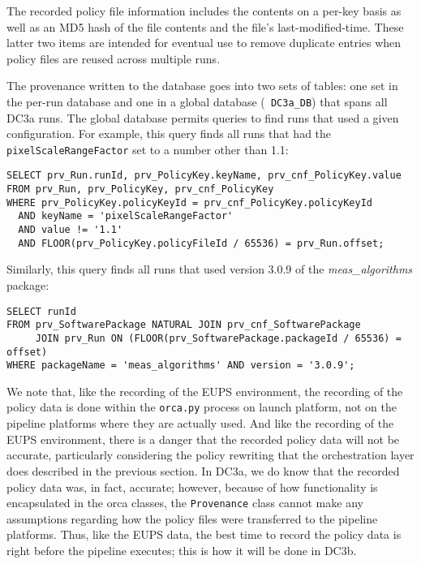 The recorded policy file information includes the contents on a per-key
basis as well as an MD5 hash of the file contents and the file's
last-modified-time.  These latter two items are intended for eventual
use to remove duplicate entries when policy files are reused across
multiple runs.

The provenance written to the database goes into two sets of tables: one
set in the per-run database and one in a global database ({\tt
DC3a\_DB}) that spans all DC3a runs.  The global database permits
queries to find runs that used a given configuration.  For example, this
query finds all runs that had the {\tt pixelScaleRangeFactor} set to a
number other than 1.1:

\begin{verbatim}
SELECT prv_Run.runId, prv_PolicyKey.keyName, prv_cnf_PolicyKey.value
FROM prv_Run, prv_PolicyKey, prv_cnf_PolicyKey
WHERE prv_PolicyKey.policyKeyId = prv_cnf_PolicyKey.policyKeyId
  AND keyName = 'pixelScaleRangeFactor'
  AND value != '1.1'
  AND FLOOR(prv_PolicyKey.policyFileId / 65536) = prv_Run.offset;
\end{verbatim}

Similarly, this query finds all runs that used version 3.0.9 of the {\it
meas\_algorithms} package:

\begin{verbatim}
SELECT runId
FROM prv_SoftwarePackage NATURAL JOIN prv_cnf_SoftwarePackage
     JOIN prv_Run ON (FLOOR(prv_SoftwarePackage.packageId / 65536) = offset)
WHERE packageName = 'meas_algorithms' AND version = '3.0.9';
\end{verbatim}

We note that, like the recording of the EUPS environment, the
recording of the policy data is done within the {\tt orca.py} process
on launch platform, not on the pipeline platforms where they are
actually used.  And like the recording of the EUPS environment, there
is a danger that the recorded policy data will not be accurate,
particularly considering the policy rewriting that the orchestration
layer does described in the previous section.  In DC3a, we do
know that the recorded policy data was, in fact, accurate; however,
because of how functionality is encapsulated in the orca classes, the
{\tt Provenance} class cannot make any assumptions regarding how the
policy files were transferred to the pipeline platforms.  Thus, like
the EUPS data, the best time to record the policy data is right before
the pipeline executes; this is how it will be done in DC3b.  

